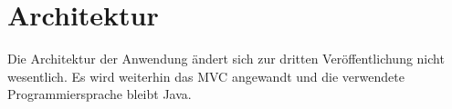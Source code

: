 \section{Architektur}
Die Architektur der Anwendung ändert sich zur dritten Veröffentlichung nicht wesentlich. Es wird weiterhin das \Gls{MVC} angewandt und die verwendete Programmiersprache bleibt Java.
